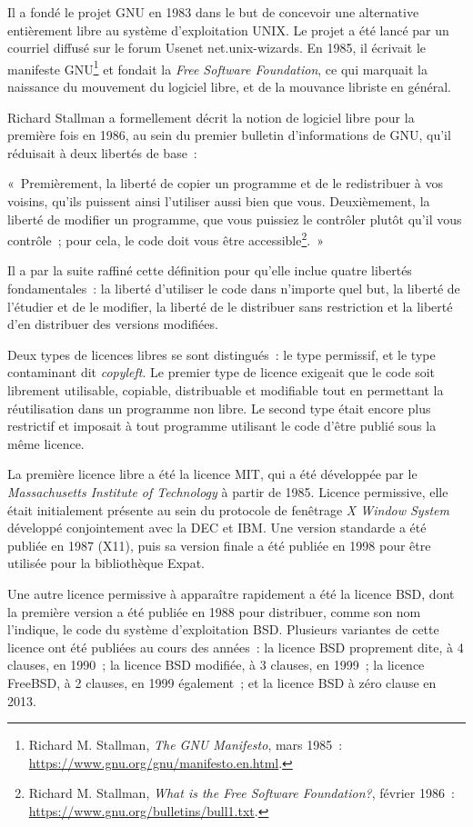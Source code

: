 \documentclass[
  a5paper,
  smalldemyvopaper,10pt,twoside,onecolumn,openright,extrafontsizes,hidelinks]{memoir}
\begin{document}
Il a fondé le projet GNU en 1983 dans le but de concevoir une
alternative entièrement libre au système d'exploitation UNIX. Le projet
a été lancé par un courriel diffusé sur le forum Usenet
net.unix-wizards. En 1985, il écrivait le manifeste GNU\footnote{Richard
  M. Stallman, \emph{The GNU Manifesto}, mars 1985~:
  \url{https://www.gnu.org/gnu/manifesto.en.html}.} et fondait la
\emph{Free Software Foundation}, ce qui marquait la naissance du
mouvement du logiciel libre, et de la mouvance libriste en général.

Richard Stallman a formellement décrit la notion de logiciel libre pour
la première fois en 1986, au sein du premier bulletin d'informations de
GNU, qu'il réduisait à deux libertés de base~:

«~Premièrement, la liberté de copier un programme et de le redistribuer
à vos voisins, qu'ils puissent ainsi l'utiliser aussi bien que vous.
Deuxièmement, la liberté de modifier un programme, que vous puissiez le
contrôler plutôt qu'il vous contrôle~; pour cela, le code doit vous être
accessible\footnote{Richard M. Stallman, \emph{What is the Free Software
  Foundation?}, février 1986~:
  \url{https://www.gnu.org/bulletins/bull1.txt}.}.~»

Il a par la suite raffiné cette définition pour qu'elle inclue quatre
libertés fondamentales~: la liberté d'utiliser le code dans n'importe
quel but, la liberté de l'étudier et de le modifier, la liberté de le
distribuer sans restriction et la liberté d'en distribuer des versions
modifiées.

Deux types de licences libres se sont distingués~: le type permissif, et
le type contaminant dit \emph{copyleft}. Le premier type de licence
exigeait que le code soit librement utilisable, copiable, distribuable
et modifiable tout en permettant la réutilisation dans un programme non
libre. Le second type était encore plus restrictif et imposait à tout
programme utilisant le code d'être publié sous la même licence.

La première licence libre a été la licence MIT, qui a été développée par
le \emph{Massachusetts Institute of Technology} à partir de 1985.
Licence permissive, elle était initialement présente au sein du
protocole de fenêtrage \emph{X Window System} développé conjointement
avec la DEC et IBM. Une version standarde a été publiée en 1987 (X11),
puis sa version finale a été publiée en 1998 pour être utilisée pour la
bibliothèque Expat.

Une autre licence permissive à apparaître rapidement a été la licence
BSD, dont la première version a été publiée en 1988 pour distribuer,
comme son nom l'indique, le code du système d'exploitation BSD.
Plusieurs variantes de cette licence ont été publiées au cours des
années~: la licence BSD proprement dite, à 4 clauses, en 1990~; la
licence BSD modifiée, à 3 clauses, en 1999~; la licence FreeBSD, à 2
clauses, en 1999 également~; et la licence BSD à zéro clause en 2013.
\end{document}
